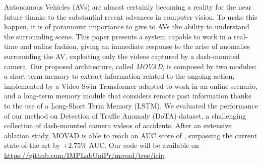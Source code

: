 Autonomous Vehicles (AVs) are almost certainly becoming a reality for the near future thanks to the substantial recent advances in computer vision.
To make this happen, it is of paramount importance to give to AVs the ability to understand the surrounding scene.
This paper presents a system capable to work in a real-time and online fashion, giving an immediate response to the arise of anomalies surrounding the AV, exploiting only the videos captured by a dash-mounted camera.
Our proposed architecture, called \emph{MOVAD}, is composed by two modules: a short-term memory to extract information related to the ongoing action, implemented by a Video Swin Transformer adapted to work in an online scenario, and a long-term memory module that considers remote past information thanks to the use of a Long-Short Term Memory (LSTM).
We evaluated the performance of our method on Detection of Traffic Anomaly (DoTA) dataset, a challenging collection of dash-mounted camera videos of accidents.
After an extensive ablation study, MOVAD is able to reach an AUC score of , surpassing the current state-of-the-art by $+2.75\%$ AUC.
Our code will be available on \url{https://github.com/IMPLabUniPr/movad/tree/icip}